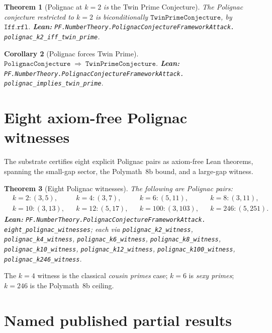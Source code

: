 \documentclass[11pt,a4paper]{article}
\theoremstyle{plain}
\newtheorem{theorem}{Theorem}[section]
\newtheorem{corollary}[theorem]{Corollary}
\theoremstyle{definition}
\begin{document}
\begin{theorem}[Polignac at $k = 2$ \emph{is} the Twin Prime Conjecture]
\label{thm:pkt}
The Polignac conjecture restricted to $k = 2$ is biconditionally
$\mathtt{TwinPrimeConjecture}$, by $\mathtt{Iff.rfl}$.
\textbf{Lean:}
\texttt{PF.NumberTheory.PolignacConjectureFrameworkAttack.\\
polignac\_k2\_iff\_twin\_prime}.
\end{theorem}

\begin{corollary}[Polignac forces Twin Prime]
\label{cor:p-implies-tp}
$\mathtt{PolignacConjecture} \;\Longrightarrow\;
\mathtt{TwinPrimeConjecture}$.
\textbf{Lean:}
\texttt{PF.NumberTheory.PolignacConjectureFrameworkAttack.\\
polignac\_implies\_twin\_prime}.
\end{corollary}

\section{Eight axiom-free Polignac witnesses}
\label{sec:witnesses}

The substrate certifies eight explicit Polignac pairs as axiom-free
Lean theorems, spanning the small-gap sector, the Polymath~8b bound,
and a large-gap witness.

\begin{theorem}[Eight Polignac witnesses]
\label{thm:eight}
The following are Polignac pairs:
\[
\begin{aligned}
&k=2: (3,5), & &k=4: (3,7), & &k=6: (5,11), & &k=8: (3,11), \\
&k=10: (3,13), & &k=12: (5,17), & &k=100: (3,103), & &k=246: (5,251).
\end{aligned}
\]
\textbf{Lean:}
\texttt{PF.NumberTheory.PolignacConjectureFrameworkAttack.\\
eight\_polignac\_witnesses};
each via \texttt{polignac\_k2\_witness},
\texttt{polignac\_k4\_witness},
\texttt{polignac\_k6\_witness},
\texttt{polignac\_k8\_witness},
\texttt{polignac\_k10\_witness},
\texttt{polignac\_k12\_witness},
\texttt{polignac\_k100\_witness},
\texttt{polignac\_k246\_witness}.
\end{theorem}

The $k = 4$ witness is the classical \emph{cousin primes} case; $k =
6$ is \emph{sexy primes}; $k = 246$ is the Polymath~8b ceiling.

\section{Named published partial results}
\label{sec:named}
\end{document}

